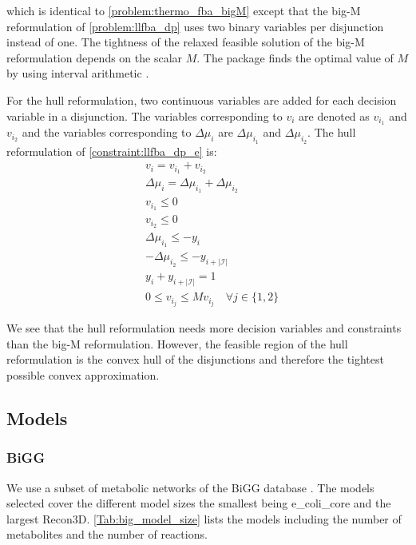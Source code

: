 \quad which is identical to \cref{problem:thermo_fba_bigM} except that the big-M reformulation of \cref{problem:llfba_dp} uses two binary variables per disjunction instead of one.
The tightness of the relaxed feasible solution of the big-M reformulation depends on the scalar $M$. The package finds the optimal value of $M$ by using interval arithmetic \cite{hutchison_automating_2010}.

For the hull reformulation, two continuous variables are added for each decision variable in a disjunction. The variables corresponding to $v_i$ are denoted as $v_{i_1}$ and $v_{i_2}$ and the variables corresponding to $\Delta \mu_i$ are $\Delta \mu_{i_1}$ and $\Delta \mu_{i_2}$. The hull reformulation of \cref{constraint:llfba_dp_e} is:
\begin{align*}
    &v_i = v_{i_1} + v_{i_2} \\
    &\Delta \mu_i = \Delta \mu_{i_1} + \Delta \mu_{i_2} \\
    &v_{i_1} \leq 0 \\
    &v_{i_2} \leq 0 \\
    &\Delta \mu_{i_1} \leq - y_i \\ 
    &- \Delta \mu_{i_2} \leq -y_{i + |\mathcal{I}|} \\
    &y_i + y_{i + |\mathcal{I}|} = 1 \\
    &0 \leq v_{i_j} \leq M v_{i_j}  \quad \forall j \in \{1,2\}
\end{align*}

We see that the hull reformulation needs more decision variables and constraints than the big-M reformulation. However, the feasible region of the hull reformulation is the convex hull of the disjunctions and therefore the tightest possible convex approximation. 


\subsection{Models} \label{section:models}
\subsubsection{BiGG}
We use a subset of metabolic networks of the BiGG database \cite{BiGG}. The models selected cover the different model sizes the smallest being \textsf{e\_coli\_core} and the largest \textsf{Recon3D}. \cref{Tab:big_model_size} lists the models including the number of metabolites and the number of reactions.

